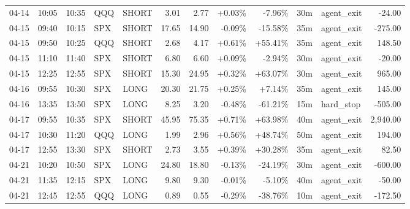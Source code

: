 \documentclass[11pt,a4paper,twoside]{article}
\begin{document}
\begin{center}
\begin{longtable}{>{\color{txtmain}}l l l l l r r r r r >{\color{txtmain}}l r}
04-14 & 10:05 & 10:35 & QQQ & SHORT & 3.01 & 2.77 & \textcolor{wingreen}{+0.03\%} & \textcolor{lossred}{-7.96\%} & 30m & agent\_exit & \textcolor{lossred}{-24.00} \\
04-15 & 09:40 & 10:15 & SPX & SHORT & 17.65 & 14.90 & \textcolor{lossred}{-0.09\%} & \textcolor{lossred}{-15.58\%} & 35m & agent\_exit & \textcolor{lossred}{-275.00} \\
04-15 & 09:50 & 10:25 & QQQ & SHORT & 2.68 & 4.17 & \textcolor{wingreen}{+0.61\%} & \textcolor{wingreen}{+55.41\%} & 35m & agent\_exit & \textcolor{wingreen}{148.50} \\
04-15 & 11:10 & 11:40 & SPX & SHORT & 6.80 & 6.60 & \textcolor{wingreen}{+0.09\%} & \textcolor{lossred}{-2.94\%} & 30m & agent\_exit & \textcolor{lossred}{-20.00} \\
04-15 & 12:25 & 12:55 & SPX & SHORT & 15.30 & 24.95 & \textcolor{wingreen}{+0.32\%} & \textcolor{wingreen}{+63.07\%} & 30m & agent\_exit & \textcolor{wingreen}{965.00} \\
04-16 & 09:55 & 10:30 & SPX & LONG & 20.30 & 21.75 & \textcolor{wingreen}{+0.25\%} & \textcolor{wingreen}{+7.14\%} & 35m & agent\_exit & \textcolor{wingreen}{145.00} \\
04-16 & 13:35 & 13:50 & SPX & LONG & 8.25 & 3.20 & \textcolor{lossred}{-0.48\%} & \textcolor{lossred}{-61.21\%} & 15m & hard\_stop & \textcolor{lossred}{-505.00} \\
04-17 & 09:55 & 10:35 & SPX & SHORT & 45.95 & 75.35 & \textcolor{wingreen}{+0.71\%} & \textcolor{wingreen}{+63.98\%} & 40m & agent\_exit & \textcolor{wingreen}{2,940.00} \\
04-17 & 10:30 & 11:20 & QQQ & LONG & 1.99 & 2.96 & \textcolor{wingreen}{+0.56\%} & \textcolor{wingreen}{+48.74\%} & 50m & agent\_exit & \textcolor{wingreen}{194.00} \\
04-17 & 12:55 & 13:30 & SPX & SHORT & 2.73 & 3.55 & \textcolor{wingreen}{+0.39\%} & \textcolor{wingreen}{+30.28\%} & 35m & agent\_exit & \textcolor{wingreen}{82.50} \\
04-21 & 10:20 & 10:50 & SPX & LONG & 24.80 & 18.80 & \textcolor{lossred}{-0.13\%} & \textcolor{lossred}{-24.19\%} & 30m & agent\_exit & \textcolor{lossred}{-600.00} \\
04-21 & 11:35 & 12:15 & SPX & LONG & 9.80 & 9.30 & \textcolor{lossred}{-0.01\%} & \textcolor{lossred}{-5.10\%} & 40m & agent\_exit & \textcolor{lossred}{-50.00} \\
04-21 & 12:45 & 12:55 & QQQ & LONG & 0.89 & 0.55 & \textcolor{lossred}{-0.29\%} & \textcolor{lossred}{-38.76\%} & 10m & agent\_exit & \textcolor{lossred}{-172.50} \\

\end{longtable}
\end{center}
\end{document}
